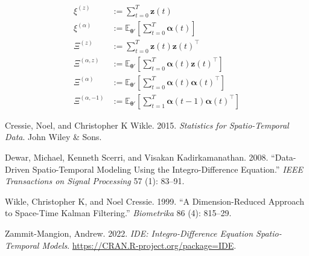 \documentclass[
  letterpaper,
  DIV=11,
  numbers=noendperiod]{scrartcl}
\newlength{\cslhangindent}
\newenvironment{CSLReferences}[2] %
 {\begin{list}{}{%
  \setlength{\itemindent}{0pt}
  \setlength{\leftmargin}{0pt}
  \setlength{\parsep}{0pt}
  \ifodd #1
   \setlength{\leftmargin}{\cslhangindent}
   \setlength{\itemindent}{-1\cslhangindent}
  \fi
  \setlength{\itemsep}{#2\baselineskip}}}
 {\end{list}}
\begin{document}
\[
\begin{split}
\xi^{(z)} &:= \sum_{t=0}^T \boldsymbol{\mathbf{z}}(t)\\
\xi^{(\alpha)} &:= \mathbb{E}_{\boldsymbol{\mathbf{\theta}}'}[\sum_{t=0}^T\boldsymbol{\mathbf{\alpha}}(t)]\\
\Xi^{(z)} &:= \sum_{t=0}^T\boldsymbol{\mathbf{z}}(t)\boldsymbol{\mathbf{z}}(t)^\intercal\\
\Xi^{(\alpha,z)} &:= \mathbb{E}_{\boldsymbol{\mathbf{\theta}}'}[\sum_{t=0}^T\boldsymbol{\mathbf{\alpha}}(t)\boldsymbol{\mathbf{z}}(t)^\intercal]\\
\Xi^{(\alpha)} &:= \mathbb{E}_{\boldsymbol{\mathbf{\theta}}'}[\sum_{t=0}^T\boldsymbol{\mathbf{\alpha}}(t)\boldsymbol{\mathbf{\alpha}}(t)^\intercal]\\
\Xi^{(\alpha,-1)} &:=\mathbb{E}_{\boldsymbol{\mathbf{\theta}}'}[\sum_{t=1}^T\boldsymbol{\mathbf{\alpha}}(t-1)\boldsymbol{\mathbf{\alpha}}(t)^\intercal]
\end{split}
\]

\label{refs}
\begin{CSLReferences}{1}{0}
Cressie, Noel, and Christopher K Wikle. 2015. \emph{Statistics for
Spatio-Temporal Data}. John Wiley \& Sons.

Dewar, Michael, Kenneth Scerri, and Visakan Kadirkamanathan. 2008.
{``Data-Driven Spatio-Temporal Modeling Using the Integro-Difference
Equation.''} \emph{IEEE Transactions on Signal Processing} 57 (1):
83--91.

Wikle, Christopher K, and Noel Cressie. 1999. {``A Dimension-Reduced
Approach to Space-Time Kalman Filtering.''} \emph{Biometrika} 86 (4):
815--29.

Zammit-Mangion, Andrew. 2022. \emph{IDE: Integro-Difference Equation
Spatio-Temporal Models}. \url{https://CRAN.R-project.org/package=IDE}.

\end{CSLReferences}
\end{document}
